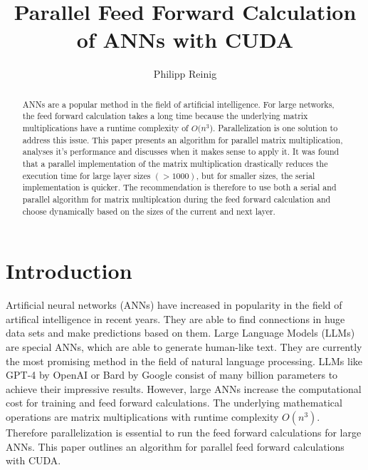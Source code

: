 \documentclass[sigconf]{acmart}
\begin{document}

\title{Parallel Feed Forward Calculation of ANNs with CUDA}

\author{Philipp Reinig}


\begin{abstract}
ANNs are a popular method in the field of artificial intelligence. For large networks, the feed forward calculation takes a long time
because the underlying matrix multiplications have a runtime complexity of $O(n^3$). Parallelization is one solution to address this issue.
This paper presents an algorithm for parallel matrix multiplication, analyses it's performance and discusses when it makes sense to apply it.
It was found that a parallel implementation of the matrix multiplication drastically reduces the execution time for large layer sizes $(>1000)$, but
for smaller sizes, the serial implementation is quicker. 
The recommendation is therefore to use both a serial and parallel algorithm for matrix multiplcation during the feed forward calculation and choose dynamically
based on the sizes of the current and next layer.

\end{abstract}

\maketitle


\section{Introduction}
Artificial neural networks (ANNs) have increased in popularity in the field of artifical intelligence in recent years.
They are able to find connections in huge data sets and make predictions based on them. 
Large Language Models (LLMs) are special ANNs, which are able to generate human-like text.
They are currently the most promising method in the field of natural language processing.
LLMs like GPT-4 by OpenAI or Bard by Google consist of many billion parameters to achieve their impressive results.
However, large ANNs increase the computational cost for training and feed forward calculations.
The underlying mathematical operations are matrix multiplications with runtime complexity \begin{math}O(n^3)\end{math}.
Therefore parallelization is essential to run the feed forward calculations for large ANNs.
This paper outlines an algorithm for parallel feed forward calculations with CUDA. 
\end{document}
